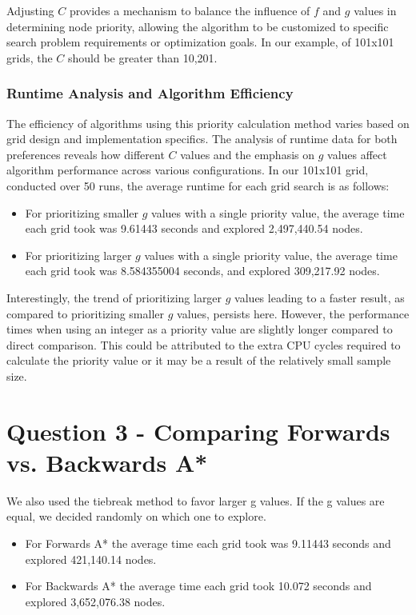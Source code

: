 \documentclass{article}
\begin{document}
Adjusting \(C\) provides a mechanism to balance the influence of \(f\) and \(g\) values in determining node priority, allowing the algorithm to be customized to specific search problem requirements or optimization goals. In our example, of 101x101 grids, the \(C\) should be greater than 10,201.

\subsubsection{Runtime Analysis and Algorithm Efficiency}
The efficiency of algorithms using this priority calculation method varies based on grid design and implementation specifics. The analysis of runtime data for both preferences reveals how different \(C\) values and the emphasis on \(g\) values affect algorithm performance across various configurations. In our 101x101 grid, conducted over 50 runs, the average runtime for each grid search is as follows:
\begin{itemize}
    \item For prioritizing smaller \(g\) values with a single priority value, the average time each grid took was 9.61443 seconds and explored 2,497,440.54 nodes.
    \item For prioritizing larger \(g\) values with a single priority value, the average time each grid took was 8.584355004 seconds, and explored 309,217.92 nodes.
\end{itemize}
Interestingly, the trend of prioritizing larger \(g\) values leading to a faster result, as compared to prioritizing smaller \(g\) values, persists here. However, the performance times when using an integer as a priority value are slightly longer compared to direct comparison. This could be attributed to the extra CPU cycles required to calculate the priority value or it may be a result of the relatively small sample size. 




\section{Question 3 - Comparing Forwards vs. Backwards A*}
We also used the tiebreak method to favor larger g values. If the g values are equal, we decided randomly on which one to explore. 

\begin{itemize}
    \item For Forwards A* the average time each grid took was 9.11443 seconds and explored 421,140.14 nodes.
    \item For Backwards A* the average time each grid took 10.072 seconds and explored 3,652,076.38 nodes. 
\end{itemize}
\end{document}
